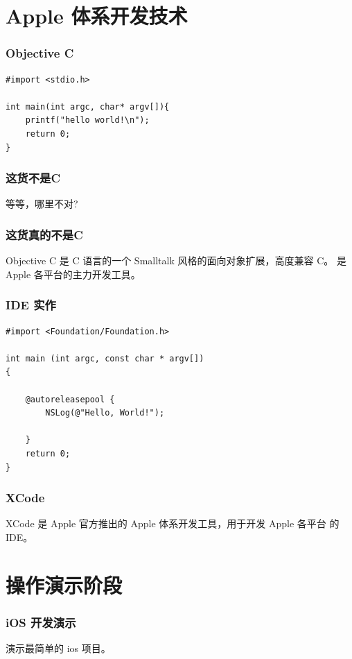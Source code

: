 \documentclass[utf8x, notes=hide]{beamer}
\begin{document}
\section{Apple 体系开发技术}
\begin{frame}[containsverbatim]
  \frametitle{Objective C}
  \begin{lstlisting}
#import <stdio.h>

int main(int argc, char* argv[]){
    printf("hello world!\n");
    return 0;
}
  \end{lstlisting}
\end{frame}
\begin{frame}
  \frametitle{这货不是C}
  \begin{center}
  \begin{huge}
    等等，哪里不对?
  \end{huge}
  \end{center}
\end{frame}
\begin{frame}
  \frametitle{这货真的不是C}
Objective C 是 C 语言的一个 Smalltalk 风格的面向对象扩展，高度兼容 C。
是 Apple 各平台的主力开发工具。
\end{frame}
\begin{frame}[containsverbatim]
\frametitle{IDE 实作}
\begin{lstlisting}
#import <Foundation/Foundation.h>

int main (int argc, const char * argv[])
{

    @autoreleasepool {
        NSLog(@"Hello, World!");
        
    }
    return 0;
}
\end{lstlisting}
\end{frame}
\begin{frame}
  \frametitle{XCode}
  XCode 是 Apple 官方推出的 Apple 体系开发工具，用于开发 Apple 各平台
  的 IDE。
\end{frame}

\section{操作演示阶段}
\begin{frame}
  \frametitle{iOS 开发演示}
演示最简单的 ios 项目。
\end{frame}
\end{document}
